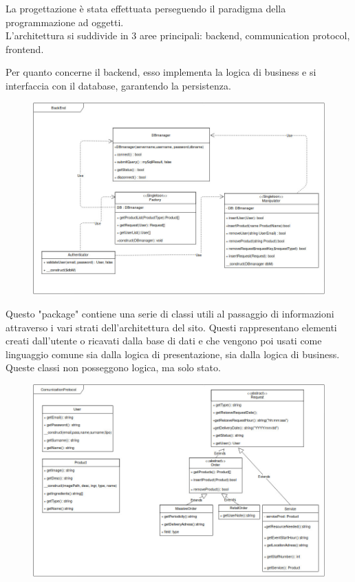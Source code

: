 La progettazione è stata effettuata perseguendo il paradigma della programmazione ad oggetti.\\
L'architettura si suddivide in 3 aree principali: backend, communication protocol, frontend.

Per quanto concerne il backend, esso implementa la logica di business e si interfaccia con il database, garantendo la persistenza.

\begin{figure}[h!]
	\includegraphics[width=1\linewidth]{StyleLatex/PHP_backend.jpg}
\end{figure}

\newpage

Questo "package" contiene una serie di classi utili al passaggio di informazioni attraverso i vari strati dell'architettura del sito. Questi rappresentano elementi creati dall'utente o ricavati dalla base di dati e che vengono poi usati come linguaggio comune sia dalla logica di presentazione, sia dalla logica di business. Queste classi non posseggono logica, ma solo stato.

\begin{figure}[h!]
	\includegraphics[width=1\linewidth]{StyleLatex/PHP_comunication_protocol.jpg}
\end{figure}

